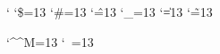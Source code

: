 %
\newskip\blanksize@
\bgroup\catcode` \catcode`\$=13 \catcode`\#=13
    \catcode`\^=13 \catcode`\_=13 \catcode`\|=13 \catcode`\~=13
\gdef\BEGINverbatim{\parskip=0pt plus1pt
    \catcode`\$=13 \def${\indent\hbox to \the\fontdimen\tw@\the\font
                         {\hss\$\hss}}
    \catcode`\&=12
    \catcode`\#=13 \def#{\indent\hbox to \the\fontdimen\tw@\the\font
                           {\hss*\#*\hss}}
    \catcode`\^=13 \def^{\indent\hbox to \the\fontdimen\tw@\the\font
                           {\hss*\mathchar"327D*\hss}}
    \catcode`\_=13 \def_{\indent\hbox to \the\fontdimen\tw@\the\font
                           {\hss\_\hss}}
    \catcode`\%=12
    \catcode`\|=13 \def|{\indent\hbox to \the\fontdimen\tw@\the\font
                          {\hss*\mathchar"326A*\hss}}
    \catcode`\~=13 \def~{\indent\hbox to \the\fontdimen\tw@\the\font
                          {\hss*\mathchar"3218*\hss}}
    \parindent\z@\lumplines\lumpspaces}
\egroup

%
{\catcode`\^^M=13 \gdef\lumplines{\catcode`\^^M=13 \let^^M=\lumpline@}}
\def\lumpline@{\par\skip@=\z@\let\munch@=\lumpB@\futurelet\lump@\lumpA@}
\def\lumpA@{\ifx\lumpline@\lump@\advance\skip@\baselineskip
    \else\let\munch@=\relax\vskip\skip@\fi\munch@}
\def\lumpB@#1{\futurelet\lump@\lumpA@}
{\catcode`\ =13 \gdef\lumpspaces{\catcode`\ =13\relax\let =\lumpspace@}}
\def\lumpspace@{\blanksize@=\the\fontdimen\tw@\the\font
    \skip@=\z@\let\munch@=\lumpb@\futurelet\lump@\lumpa@}
\def\lumpa@{\advance\skip@\blanksize@\ifx\lumpspace@\lump@
    \else\let\munch@=\relax\hskip\skip@\fi\munch@}
\def\lumpb@#1{\futurelet\lump@\lumpa@}
\let\munch@=\relax

%
\def\newpage{\balance\ifold@\null\vfill\eject\fi}
\def\evenpage{\newpage\ifodd\pageno\null\vfill\eject\fi}
\def\oddpage{\newpage\ifodd\pageno\else\null\vfill\eject\fi}

